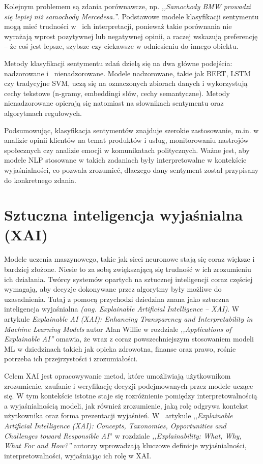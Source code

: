 \documentclass[wmii, inf, mgr]{uwmthesis}
\begin{document}
Kolejnym problemem są zdania porównawcze, np. \textit{,,Samochody BMW prowadzi się lepiej niż samochody Mercedesa.''}. Podstawowe modele klasyfikacji sentymentu mogą mieć trudności w~ ich interpretacji, ponieważ takie porównania nie wyrażają wprost pozytywnej lub negatywnej opinii, a raczej wskazują preferencję -- że coś jest lepsze, szybsze czy ciekawsze w odniesieniu do innego obiektu.

Metody klasyfikacji sentymentu zdań dzielą się na dwa główne podejścia: nadzorowane i~ nienadzorowane. Modele nadzorowane, takie jak BERT, LSTM czy tradycyjne SVM, uczą się na oznaczonych zbiorach danych i wykorzystują cechy tekstowe (n-gramy, embeddingi słów, cechy semantyczne). Metody nienadzorowane opierają się natomiast na słownikach sentymentu oraz algorytmach regułowych.

Podsumowując, klasyfikacja sentymentów znajduje szerokie zastosowanie, m.in. w analizie opinii klientów na temat produktów i usług, monitorowaniu nastrojów społecznych czy analizie emocji w komunikatach politycznych. Ważne jest, aby modele NLP stosowane w takich zadaniach były interpretowalne w kontekście wyjaśnialności, co pozwala zrozumieć, dlaczego dany sentyment został przypisany do konkretnego zdania.


\section{Sztuczna inteligencja wyjaśnialna (XAI)}
Modele uczenia maszynowego, takie jak sieci neuronowe stają się coraz większe i bardziej złożone. Niesie to za sobą zwiększającą się trudność w ich zrozumieniu ich działania. Twórcy systemów opartych na sztucznej inteligencji coraz częściej wymagają, aby decyzje dokonywane przez algorytmy były możliwe do uzasadnienia. Tutaj z pomocą przychodzi dziedzina znana jako sztuczna inteligencja wyjaśnialna \textit{(ang. Explainable Artificial Intelligence -- XAI)}. W artykule \textit{Explainable AI (XAI): Enhancing Transparency and Interpretability in Machine Learning Models} \cite{XAIAW} autor Alan Willie w rozdziale \textit{,,Applications of Explainable AI''} omawia, że wraz z coraz powszechniejszym stosowaniem modeli ML w dziedzinach takich jak opieka zdrowotna, finanse oraz prawo, rośnie potrzeba ich przejrzystości i zrozumiałości.

Celem XAI jest opracowywanie metod, które umożliwiają użytkownikom zrozumienie, zaufanie i weryfikację decyzji podejmowanych przez modele uczące się. W tym kontekście istotne staje się rozróżnienie pomiędzy interpretowalnością a wyjaśnialnością modeli, jak również zrozumienie, jaką rolę odgrywa kontekst użytkownika oraz forma prezentacji wyjaśnień. W~ artykule ,,\textit{Explainable Artificial Intelligence (XAI): Concepts, Taxonomies, Opportunities and Challenges toward Responsible AI}'' \cite{XAI} w rozdziale \textit{,,Explainability: What, Why, What For and How?''} autorzy wprowadzają kluczowe definicje wyjaśnialności, interpretowalności, wyjaśniając ich rolę w XAI.
\end{document}
